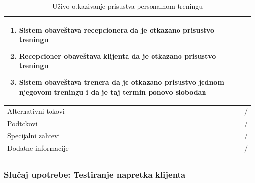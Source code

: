 \begin{longtable}{| p{} | p{} |}
\begin{enumerate}
    \item Sistem obaveštava recepcionera da je otkazano prisustvo treningu
    \item Recepcioner obaveštava klijenta da je otkazano prisustvo treningu
    \item Sistem obaveštava trenera da je otkazano prisustvo jednom njegovom treningu i da je taj termin ponovo slobodan
   \end{enumerate}\\
\hline
    Alternativni tokovi & /\\
\hline
    Podtokovi & /\\
\hline
    Specijalni zahtevi & /\\
\hline
    Dodatne informacije & /\\
\hline
\caption{Uživo otkazivanje prisustva personalnom treningu}
\end{longtable}



\subsubsection{Slučaj upotrebe: Testiranje napretka klijenta}

